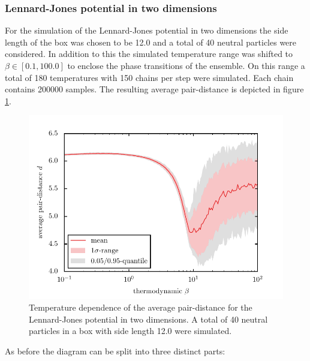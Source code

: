 \documentclass[11pt, a4paper]{article}
\numberwithin{equation}{section}
\begin{document}
\subsubsection{Lennard-Jones potential in two dimensions}
\label{sec:lennard_jones_2d}
For the simulation of the Lennard-Jones potential in two dimensions the side length of the box was chosen to be \num{12.0} and a total of 40 neutral particles were considered.
In addition to this the simulated temperature range was shifted to $\beta \in [0.1, 100.0]$ to enclose the phase transitions of the ensemble.
On this range a total of 180 temperatures with 150 chains per step were simulated.
Each chain contains \num{200000} samples.
The resulting average pair-distance is depicted in figure \ref{Fig:Temp_dep_LJ2D}.
\begin{figure}[h]
	\centering
	\includegraphics{./figures/temp_dep_lennard_jones2d.pdf}
	\caption{Temperature dependence of the average pair-distance for the Lennard-Jones potential in two dimensions.
		A total of 40 neutral particles in a box with side length 12.0 were simulated.}
	\label{Fig:Temp_dep_LJ2D}
\end{figure}
As before the diagram can be split into three distinct parts:
\end{document}
